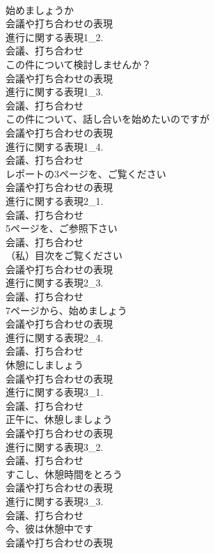 \documentclass[8pt]{extreport}
\begin{document}
\begin{CJK}{UTF8}{min}
\\	始めましょうか	
\\	会議や打ち合わせの表現
\\	進行に関する表現1_2.
\\	会議、打ち合わせ
\\	この件について検討しませんか？	
\\	会議や打ち合わせの表現
\\	進行に関する表現1_3.
\\	会議、打ち合わせ
\\	この件について、話し合いを始めたいのですが	
\\	会議や打ち合わせの表現
\\	進行に関する表現1_4.
\\	会議、打ち合わせ
\\	レポートの3ページを、ご覧ください	
\\	会議や打ち合わせの表現
\\	進行に関する表現2_1.
\\	会議、打ち合わせ
\\	5ページを、ご参照下さい	
\\	会議、打ち合わせ
\\	（私）目次をご覧ください	
\\	会議や打ち合わせの表現
\\	進行に関する表現2_3.
\\	会議、打ち合わせ
\\	7ページから、始めましょう	
\\	会議や打ち合わせの表現
\\	進行に関する表現2_4.
\\	会議、打ち合わせ
\\	休憩にしましょう	
\\	会議や打ち合わせの表現
\\	進行に関する表現3_1.
\\	会議、打ち合わせ
\\	正午に、休憩しましょう	
\\	会議や打ち合わせの表現
\\	進行に関する表現3_2.
\\	会議、打ち合わせ
\\	すこし、休憩時間をとろう	
\\	会議や打ち合わせの表現
\\	進行に関する表現3_3.
\\	会議、打ち合わせ
\\	今、彼は休憩中です	
\\	会議や打ち合わせの表現

\end{CJK}
\end{document}
